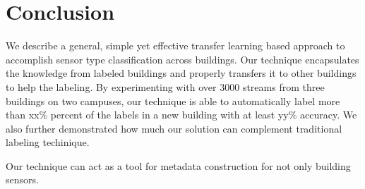 \section{Conclusion}
We describe a general, simple yet effective transfer learning based approach to accomplish sensor type classification across buildings.
Our technique encapsulates the knowledge from labeled buildings and properly transfers it to other buildings to help the labeling.
By experimenting with over 3000 streams from three buildings on two campuses, our technique is able to automatically label more than xx\% percent of the labels in a new building with at least yy\% accuracy.
We also further demonstrated how much our solution can complement traditional labeling techinique.

Our technique can act as a tool for metadata construction for not only building sensors. 

